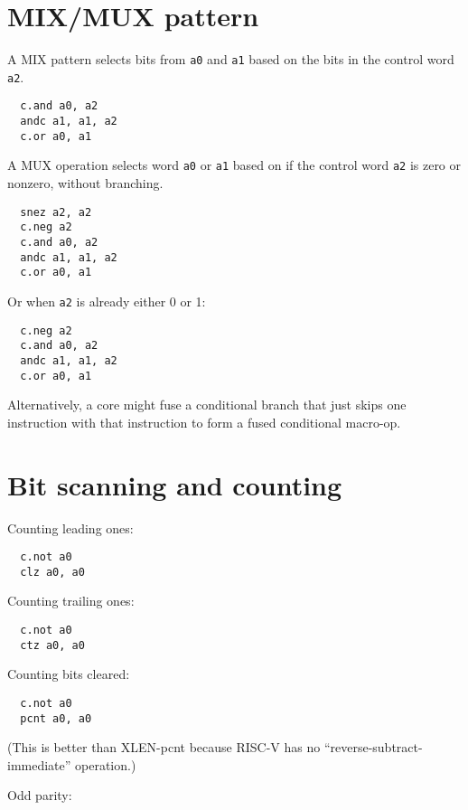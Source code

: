 \section{MIX/MUX pattern}
\label{mixmux}

A MIX pattern selects bits from {\tt a0} and {\tt a1} based on the bits in
the control word {\tt a2}.

\begin{verbatim}
  c.and a0, a2
  andc a1, a1, a2
  c.or a0, a1
\end{verbatim}

A MUX operation selects word {\tt a0} or {\tt a1} based on if the control
word {\tt a2} is zero or nonzero, without branching.

\begin{verbatim}
  snez a2, a2
  c.neg a2
  c.and a0, a2
  andc a1, a1, a2
  c.or a0, a1
\end{verbatim}

Or when {\tt a2} is already either 0 or 1:

\begin{verbatim}
  c.neg a2
  c.and a0, a2
  andc a1, a1, a2
  c.or a0, a1
\end{verbatim}

Alternatively, a core might fuse a conditional branch that just skips one
instruction with that instruction to form a fused conditional macro-op.

\section{Bit scanning and counting}

Counting leading ones:

\begin{verbatim}
  c.not a0
  clz a0, a0
\end{verbatim}

Counting trailing ones:

\begin{verbatim}
  c.not a0
  ctz a0, a0
\end{verbatim}

Counting bits cleared:

\begin{verbatim}
  c.not a0
  pcnt a0, a0
\end{verbatim}

(This is better than XLEN-pcnt because RISC-V has no ``reverse-subtract-immediate'' operation.)

Odd parity:

